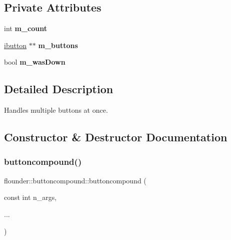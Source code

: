 \subsection*{Private Attributes}
\begin{DoxyCompactItemize}
\item 
\mbox{\label{classflounder_1_1buttoncompound_abd9fc2f19b8792e9086fa6d2e1ba99fc}} 
int {\bfseries m\+\_\+count}
\item 
\mbox{\label{classflounder_1_1buttoncompound_aaa087c79af2ceb2df78310ac780037f2}} 
\hyperlink{classflounder_1_1ibutton}{ibutton} $\ast$$\ast$ {\bfseries m\+\_\+buttons}
\item 
\mbox{\label{classflounder_1_1buttoncompound_aeeefd0e962fb26c9ce781d87ebd74f12}} 
bool {\bfseries m\+\_\+was\+Down}
\end{DoxyCompactItemize}


\subsection{Detailed Description}
Handles multiple buttons at once. 



\subsection{Constructor \& Destructor Documentation}
\mbox{\label{classflounder_1_1buttoncompound_a6fc9975e305663650b46f7034efab5af}} 
\subsubsection{\texorpdfstring{buttoncompound()}{buttoncompound()}}
{\footnotesize\ttfamily flounder\+::buttoncompound\+::buttoncompound (\begin{DoxyParamCaption}\item[{const int}]{n\+\_\+args,  }\item[{}]{... }\end{DoxyParamCaption})}



